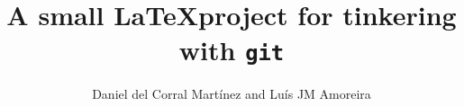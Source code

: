 \documentclass{report}
\title{A small \LaTeX project for tinkering with \texttt{git}}
\author{Daniel del Corral Mart\'inez and Lu\'is JM Amoreira}
\begin{document}
\maketitle

\printglossary
\end{document}
